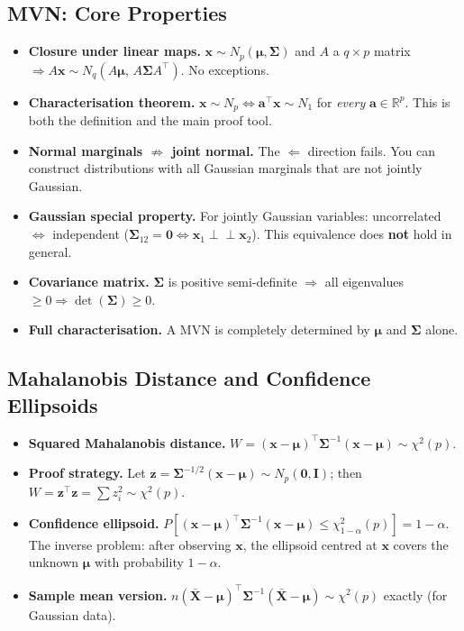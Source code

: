 \documentclass[12pt, a4paper]{article}
\begin{document}
\subsection*{MVN: Core Properties}
\begin{itemize}[itemsep=5pt]
  \item \textbf{Closure under linear maps.} $\mathbf{x} \sim N_p(\boldsymbol{\mu}, \boldsymbol{\Sigma})$ and $A$ a $q \times p$ matrix $\Rightarrow A\mathbf{x} \sim N_q(A\boldsymbol{\mu},\, A\boldsymbol{\Sigma} A^\top)$. No exceptions.
  \item \textbf{Characterisation theorem.} $\mathbf{x} \sim N_p \Leftrightarrow \mathbf{a}^\top \mathbf{x} \sim N_1$ for \textit{every} $\mathbf{a} \in \mathbb{R}^p$. This is both the definition and the main proof tool.
  \item \textbf{Normal marginals $\not\Rightarrow$ joint normal.} The $\Leftarrow$ direction fails. You can construct distributions with all Gaussian marginals that are not jointly Gaussian.
  \item \textbf{Gaussian special property.} For jointly Gaussian variables: uncorrelated $\Leftrightarrow$ independent ($\boldsymbol{\Sigma}_{12} = \mathbf{0} \Leftrightarrow \mathbf{x}_1 \perp\!\!\!\perp \mathbf{x}_2$). This equivalence does \textbf{not} hold in general.
  \item \textbf{Covariance matrix.} $\boldsymbol{\Sigma}$ is positive semi-definite $\Rightarrow$ all eigenvalues $\geq 0 \Rightarrow \det(\boldsymbol{\Sigma}) \geq 0$.
  \item \textbf{Full characterisation.} A MVN is completely determined by $\boldsymbol{\mu}$ and $\boldsymbol{\Sigma}$ alone.
\end{itemize}

\subsection*{Mahalanobis Distance and Confidence Ellipsoids}
\begin{itemize}[itemsep=5pt]
  \item \textbf{Squared Mahalanobis distance.} $W = (\mathbf{x} - \boldsymbol{\mu})^\top \boldsymbol{\Sigma}^{-1} (\mathbf{x} - \boldsymbol{\mu}) \sim \chi^2(p)$.
  \item \textbf{Proof strategy.} Let $\mathbf{z} = \boldsymbol{\Sigma}^{-1/2}(\mathbf{x}-\boldsymbol{\mu}) \sim N_p(\mathbf{0}, \mathbf{I})$; then $W = \mathbf{z}^\top\mathbf{z} = \sum z_i^2 \sim \chi^2(p)$.
  \item \textbf{Confidence ellipsoid.} $P\!\left[(\mathbf{x}-\boldsymbol{\mu})^\top\boldsymbol{\Sigma}^{-1}(\mathbf{x}-\boldsymbol{\mu}) \leq \chi^2_{1-\alpha}(p)\right] = 1 - \alpha$. The inverse problem: after observing $\mathbf{x}$, the ellipsoid centred at $\mathbf{x}$ covers the unknown $\boldsymbol{\mu}$ with probability $1-\alpha$.
  \item \textbf{Sample mean version.} $n(\bar{\mathbf{X}} - \boldsymbol{\mu})^\top \boldsymbol{\Sigma}^{-1}(\bar{\mathbf{X}} - \boldsymbol{\mu}) \sim \chi^2(p)$ exactly (for Gaussian data).
\end{itemize}
\end{document}

